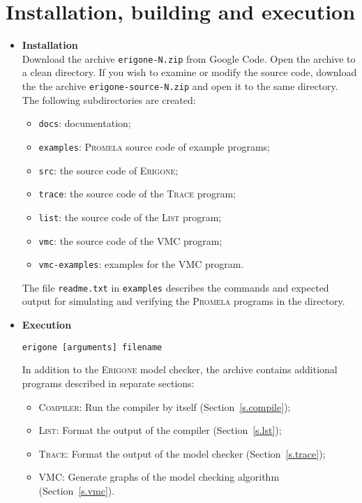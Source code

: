 \documentclass[11pt]{article}
\newcommand*{\prg}{\textsc{Erigone}}
\newcommand*{\trc}{\textsc{Trace}}
\newcommand*{\lst}{\textsc{List}}
\newcommand*{\vmc}{\textsc{VMC}}
\newcommand*{\cmp}{\textsc{Compiler}}
\newcommand*{\prm}{\textsc{Promela}}
\newcommand*{\p}[1]{\texttt{#1}}
\begin{document}
\section{Installation, building and execution}
\begin{itemize}

\item \textbf{Installation}\\Download the archive \p{erigone-N.zip} from
Google Code. Open the archive to a clean directory. If you wish to
examine or modify the source code, download the the archive
\p{erigone-source-N.zip} and open it to the same directory. The
following subdirectories are created:

\begin{itemize}
\item \p{docs}: documentation;
\item \p{examples}: \prm{} source code of example programs;
\item \p{src}: the source code of \prg{};
\item \p{trace}: the source code of the \trc{} program;
\item \p{list}: the source code of the \lst{} program;
\item \p{vmc}: the source code of the \vmc{} program;
\item \p{vmc-examples}: examples for the \vmc{} program.
\end{itemize}

The file \p{readme.txt} in \p{examples} describes the commands and
expected output for simulating and verifying the \prm{} programs in the
directory.

\item \textbf{Execution}
\begin{verbatim}
erigone [arguments] filename
\end{verbatim}

In addition to the \prg{} model checker, the archive contains additional
programs described in separate sections:

\begin{itemize}
\item \cmp{}: Run the compiler by itself (Section~\ref{s.compile});
\item \lst{}: Format the output of the compiler (Section~\ref{s.lst});
\item \trc{}: Format the output of the model checker (Section~\ref{s.trace});
\item \vmc{}: Generate graphs of the model checking algorithm
  (Section~\ref{s.vmc}).
\end{itemize}


\end{itemize}
\end{document}
